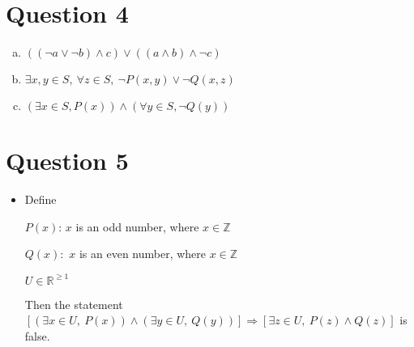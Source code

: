 \documentclass[12pt]{article}
\begin{document}
\section*{Question 4}
\begin{enumerate}[a.]
    \item

    $((\neg a \lor \neg b) \land c) \lor ((a \land b) \land \neg c)$

    \item

    $\exists x,y \in S,\:\forall z \in S,\:\neg P(x,y) \lor \neg Q(x,z)$

    \item

    $(\exists x \in S, P(x)) \land (\forall y \in S, \neg Q(y))$
\end{enumerate}

\section*{Question 5}
\begin{itemize}
    \item

    Define

    $P(x)$: $x$ is an odd number, where $x \in \mathbb{Z}$

    $Q(x):$ $x$ is an even number, where $x \in \mathbb{Z}$

    $U \in \mathbb{R}^{\geq 1}$

    \bigskip

    Then the statement $\left[ (\exists x \in U,\:P(x)) \land (\exists y \in U,\:Q(y)) \right]
    \Rightarrow \left[ \exists z \in U,\: P(z) \land Q(z) \right]$ is false.

\end{itemize}
\end{document}
